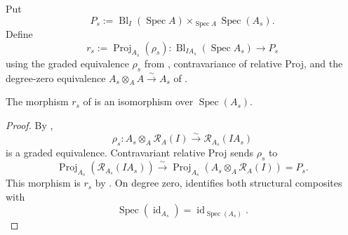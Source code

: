 \begin{definition}
  \label{def:nagata-affine-blowup-restriction-map}

  Put
  \[
    P_s:=\operatorname{Bl}_I(\operatorname{Spec}A)
      \times_{\operatorname{Spec}A}\operatorname{Spec}(A_s).
  \]
  Define
  \[
    r_s:=\operatorname{Proj}_{A_s}(\rho_s)\colon
    \operatorname{Bl}_{IA_s}(\operatorname{Spec}A_s)
      \longrightarrow
    P_s
  \]
  using the graded equivalence $\rho_s$ from
  , contravariance of relative Proj,
  and the degree-zero equivalence
  $A_s\otimes_AA\xrightarrow{\sim}A_s$ of
  .
\end{definition}

\begin{proposition}
  \label{prop:nagata-affine-blowup-restrict}

  The morphism $r_s$ of  is an
  isomorphism over
  $\operatorname{Spec}(A_s)$.
\end{proposition}

\begin{proof}
  By ,
  \[
    \rho_s\colon A_s\otimes_A\mathcal R_A(I)
      \xrightarrow{\sim}\mathcal R_{A_s}(IA_s)
  \]
  is a graded equivalence.  Contravariant relative Proj sends $\rho_s$ to
  \[
    \operatorname{Proj}_{A_s}(\mathcal R_{A_s}(IA_s))
      \xrightarrow{\sim}
    \operatorname{Proj}_{A_s}(A_s\otimes_A\mathcal R_A(I))=P_s.
  \]
  This morphism is $r_s$ by
  .  On degree zero,
   identifies both
  structural composites with
  \[
    \operatorname{Spec}(\operatorname{id}_{A_s})
      =\operatorname{id}_{\operatorname{Spec}(A_s)}.
  \]
\end{proof}

